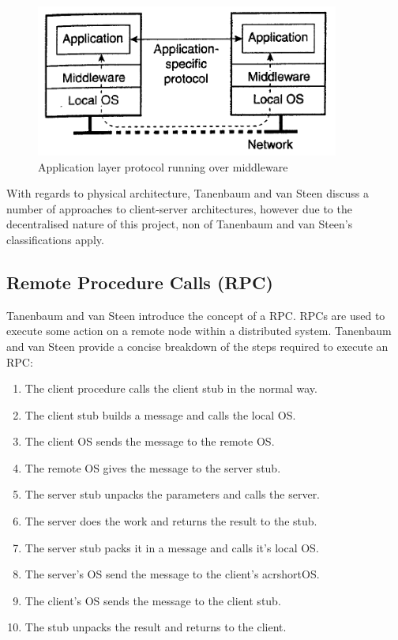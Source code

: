 \documentclass[a4paper, 11pt]{report}
\begin{document}
\begin{figure}[H]
\centering
\includegraphics[height=5cm,keepaspectratio]{appl_layer_proto}
\caption{Application layer protocol running over \gls{middleware} \cite{tanenbaumdist}} 
\label{fig:middlewarelayers}
\end{figure}

With regards to physical architecture, Tanenbaum and van Steen discuss a number of approaches to client-server architectures, however due to the decentralised nature of this project, non of Tanenbaum and van Steen's classifications apply. 

\subsection{Remote Procedure Calls (RPC)}
Tanenbaum and van Steen introduce the concept of a \acrfull{RPC}. \acrshort{RPC}s are used to execute some action on a remote node within a distributed system.  Tanenbaum and van Steen provide a concise breakdown of the steps required to execute an \acrshort{RPC}:

\begin{enumerate}
    \item The client procedure calls the client \gls{stub} in the normal way.
    \item The client \gls{stub} builds a message and calls the local \acrfull{OS}.
    \item The client \acrshort{OS} sends the message to the remote \acrshort{OS}.
    \item The remote \acrshort{OS} gives the message to the server \gls{stub}.
    \item The server \gls{stub} unpacks the parameters and calls the server.
    \item The server does the work and returns the result to the \gls{stub}.
    \item The server \gls{stub} packs it in a message and calls it's local \acrshort{OS}.
    \item The server's \acrshort{OS} send the message to the client's acrshort{OS}.
    \item The client's \acrshort{OS} sends the message to the client \gls{stub}.
    \item The \gls{stub} unpacks the result and returns to the client.
\end{enumerate}
\end{document}
